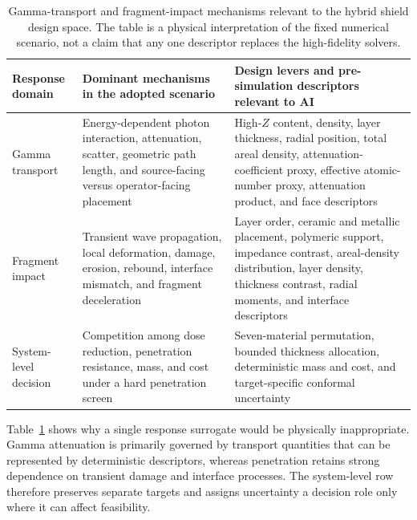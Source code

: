 \documentclass[12pt]{elsarticle}
\newif\ifproductionnotes
\newcommand{\productionnote}[1]{%
\ifproductionnotes
\par\medskip\noindent\fcolorbox{black}{gray!12}{\begin{minipage}{0.94\linewidth}\footnotesize\textbf{Production note for the figure/table designer.} #1\end{minipage}}\par\medskip
\fi}
\begin{document}
	\begin{table}[htbp]
		\centering
		\caption{Gamma-transport and fragment-impact mechanisms relevant to the hybrid shield design space. The table is a physical interpretation of the fixed numerical scenario, not a claim that any one descriptor replaces the high-fidelity solvers.}
		\label{tab:mechanisms}
		\footnotesize
		\begin{tabular}{@{}>{\raggedright\arraybackslash}p{}>{\raggedright\arraybackslash}p{}>{\raggedright\arraybackslash}p{}@{}}
			\toprule
			Response domain & Dominant mechanisms in the adopted scenario & Design levers and pre-simulation descriptors relevant to AI \\
			\midrule
			Gamma transport & Energy-dependent photon interaction, attenuation, scatter, geometric path length, and source-facing versus operator-facing placement & High-$Z$ content, density, layer thickness, radial position, total areal density, attenuation-coefficient proxy, effective atomic-number proxy, attenuation product, and face descriptors \\
			Fragment impact & Transient wave propagation, local deformation, damage, erosion, rebound, interface mismatch, and fragment deceleration & Layer order, ceramic and metallic placement, polymeric support, impedance contrast, areal-density distribution, layer density, thickness contrast, radial moments, and interface descriptors \\
			System-level decision & Competition among dose reduction, penetration resistance, mass, and cost under a hard penetration screen & Seven-material permutation, bounded thickness allocation, deterministic mass and cost, and target-specific conformal uncertainty \\
			\bottomrule
		\end{tabular}
	\end{table}
	\productionnote{\textbf{Tabela~\ref{tab:mechanisms} --- briefing para Carlos.} Transformar esta tabela em uma matriz de tr\^es faixas horizontais, uma para transporte gama, uma para impacto por fragmento e uma para decis\~ao de sistema. Manter as tr\^es colunas conceituais e usar uma cor discreta por faixa. A tabela deve ser refeita em vetor e servir como ponte entre a Figura~\ref{fig:rdd_context} e a metodologia computacional. N\~ao inserir propriedades num\'ericas novas.}

	Table~\ref{tab:mechanisms} shows why a single response surrogate would be physically inappropriate. Gamma attenuation is primarily governed by transport quantities that can be represented by deterministic descriptors, whereas penetration retains strong dependence on transient damage and interface processes. The system-level row therefore preserves separate targets and assigns uncertainty a decision role only where it can affect feasibility.
\end{document}
